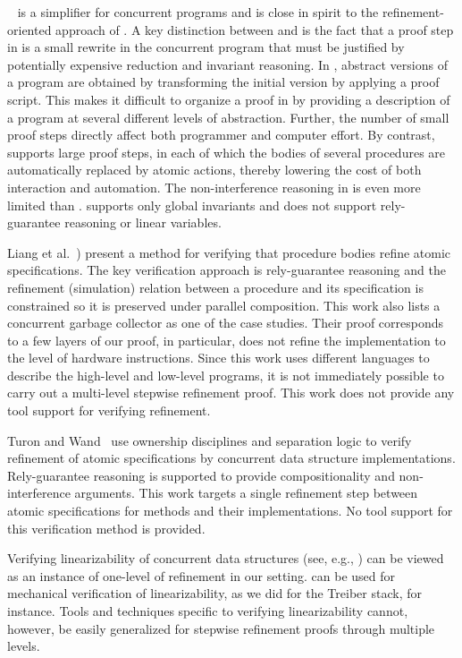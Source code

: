 \QED~\cite{ElmasQT09} is a simplifier for concurrent programs and is close in spirit to the 
refinement-oriented approach of \civl.
A key distinction between \civl and \QED is the fact that a proof step in \QED is a small rewrite in the concurrent program
that must be justified by potentially expensive reduction and invariant reasoning.
In \QED, abstract versions of a program are obtained by transforming the initial
version by applying a proof script. 
This makes it difficult to organize a proof in \QED by providing a
description of a program at several different levels of abstraction. 
Further, the number of small proof steps directly affect both programmer
and computer effort. 
By contrast, \civl supports large proof steps, in each of which the bodies of several procedures
are automatically replaced by atomic actions, thereby lowering the cost of both interaction and automation.
The non-interference reasoning in \QED is even more limited than \calvin.
\QED supports only global invariants and does not support rely-guarantee reasoning or linear variables.

Liang et al.~\cite{LiangRGSim}) present a method for verifying that procedure
bodies refine atomic specifications. 
The key verification approach is
rely-guarantee reasoning and the refinement (simulation) relation between
a procedure and its specification is constrained so it is preserved under
parallel composition. 
This work also lists a concurrent garbage collector as one of the case
studies. 
Their proof corresponds to a few layers of our proof, in particular,
does not refine the implementation to the level of hardware
instructions. 
Since this work uses different languages to describe the high-level
and low-level programs, it is not immediately possible to carry out a
multi-level stepwise refinement proof. 
This work does not provide any tool support for verifying refinement. 

Turon and Wand~\cite{TuronM11} use ownership disciplines and
separation logic to verify refinement of atomic specifications by 
concurrent data structure implementations. Rely-guarantee reasoning is
supported to provide compositionality and non-interference
arguments. This work targets a single refinement step between atomic
specifications for methods and their implementations. 
No tool support for this verification method is provided. 

Verifying linearizability of concurrent data structures (see, e.g.,
\cite{tacasLin,aliLin}) can be viewed as an instance of one-level of
refinement in our setting. \civl can be used for mechanical
verification of linearizability, as we did for the Treiber stack, for
instance. Tools and techniques specific to verifying linearizability
cannot, however, be easily generalized for stepwise refinement proofs
through multiple levels. 

